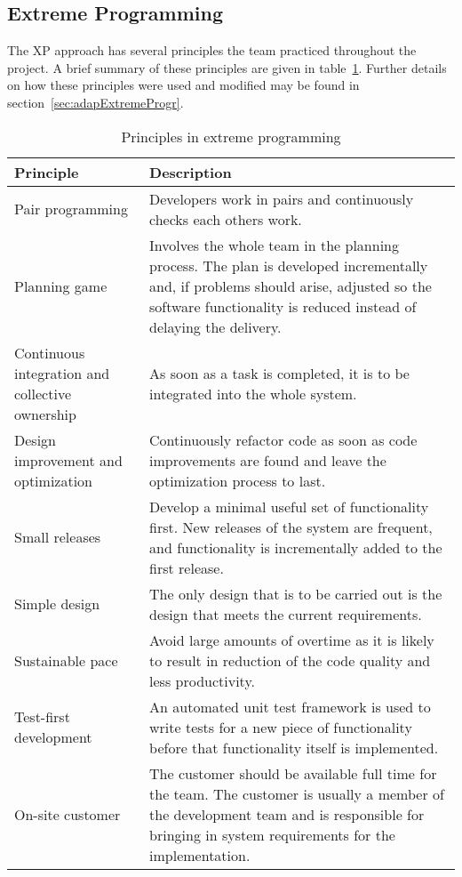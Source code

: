 \subsection{Extreme Programming}
The XP approach has several principles the team practiced throughout the project. A brief summary of these principles are given in table~\ref{tab:exProg}. Further details on how these principles were used and modified may be found in section~\ref{sec:adapExtremeProgr}.

\begin{table}[H]
\begin{tabular}{|p{4cm}|p{11.7cm}|}
\hline
\textbf{Principle} & \textbf{Description} \\\hline
Pair programming & Developers work in pairs and continuously checks each others work.\\\hline
Planning game & Involves the whole team in the planning process. The plan is developed incrementally and, if problems should arise, adjusted so the software functionality is reduced instead of delaying the delivery.
\\\hline
Continuous integration and collective ownership& As soon as a task is completed, it is to be integrated into the whole system.\\\hline
Design improvement and optimization & Continuously refactor code as soon as code improvements are found and leave the optimization process to last. \\\hline
Small releases & Develop a minimal useful set of functionality first. New releases of the system are frequent, and functionality is incrementally added to the first release.\\\hline
Simple design & The only design that is to be carried out is the design that meets the current requirements.\\\hline
Sustainable pace & Avoid large amounts of overtime as it is likely to result in reduction of the code quality and less productivity. \\\hline
Test-first development & An automated unit test framework is used to write tests for a new piece of functionality before that functionality itself is implemented. \\\hline
On-site customer & The customer should be available full time for the team. The customer is usually a member of the development team and is responsible for bringing in system requirements for the implementation.\\\hline
\end{tabular}
\caption{Principles in extreme programming}
\label{tab:exProg}
\end{table}
